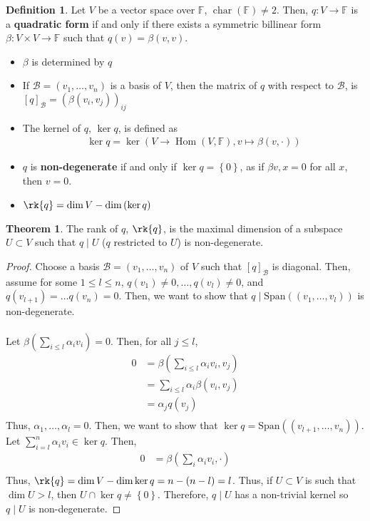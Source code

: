 \documentclass[letterpaper,12pt]{article}
\theoremstyle{definition}
\newtheorem*{definition}{Definition}
\newtheorem*{theorem}{Theorem}
\newcommand{\set}[1]{\left\{ #1 \right\}}
\newcommand{\Span}[1]{\text{Span}\left(#1 \right)}
\begin{document}
\begin{definition}
Let $V$ be a vector space over $\mathbb{F}$, $\operatorname{char}(\mathbb{F}) \neq 2$. Then, $q: V \rightarrow \mathbb{F}$ is a \textbf{quadratic form} if and only if there exists a symmetric billinear form $\beta: V \times V \rightarrow \mathbb{F}$ such that $q(v) = \beta(v,v)$.
\begin{itemize}
    \item $\beta$ is determined by $q$
    \item If $\mathcal{B} = (v_1, \dots, v_n)$ is a basis of $V$, then the matrix of $q$ with respect to $\mathcal{B}$, is $[q]_{\mathcal{B}} = (\beta(v_i, v_j))_{ij}$
    \item The kernel of $q$, $\ker{q}$, is defined as
    \begin{align*}
        \ker{q} = \ker{\left(V \longrightarrow \operatorname{Hom}(V, \mathbb{F}), v \longmapsto \beta(v, \cdot) \right)}
    \end{align*}
    \item $q$ is \textbf{non-degenerate} if and only if $\ker{q} = \set{0}$, as if $\beta{v,x} = 0$ for all $x$, then $v = 0$.
    \item $\rk{q} = \dim{V} - \dim{(\ker{q})}$
\end{itemize}
\end{definition}


\begin{theorem}
The rank of $q$, $\rk{q}$, is the maximal dimension of a subspace $U \subset V$ such that $q \mid U$ ($q$ restricted to $U$) is non-degenerate.
\end{theorem}
\begin{proof}
Choose a basis $\mathcal{B} = (v_1, \dots, v_n)$ of $V$ such that $[q]_{\mathcal{B}}$ is diagonal. Then, assume for some $1 \leq l \leq n$, $q(v_1) \neq 0, \dots, q(v_l) \neq 0$, and $q(v_{l+1}) = \dots q(v_n) = 0$. Then, we want to show that $q \mid \Span{(v_1, \dots, v_l)}$ is non-degenerate.
\\ \\ Let $\beta \left( \sum_{i \leq l} \alpha_i v_i \right) = 0$. Then, for all $j \leq l$,
\begin{align*}
    0 & = \beta \left( \sum_{i \leq l} \alpha_i v_i, v_j \right) \\
    & = \sum_{i \leq l} \alpha_i \beta(v_i, v_j) \\
    & = \alpha_j q(v_j) \\
\end{align*}
Thus, $\alpha_1, \dots, \alpha_l = 0$. Then, we want to show that $\ker{q} = \Span{(v_{l+1}, \dots, v_n)}$. Let $\sum_{i=l}^n \alpha_i v_i \in \ker{q}$. Then,
\begin{align*}
    0 & = \beta \left( \sum_{i} \alpha_i v_i, \cdot \right) \\
\end{align*}
Thus, $\rk{q} = \dim{V} - \dim{\ker{q}} = n - (n-l) = l$. Thus, if $U \subset V$ is such that $\dim{U} > l$, then $U \cap \ker{q} \neq \set{0}$. Therefore, $q \mid U$ has a non-trivial kernel so $q \mid U$ is non-degenerate.
\end{proof}
\end{document}
